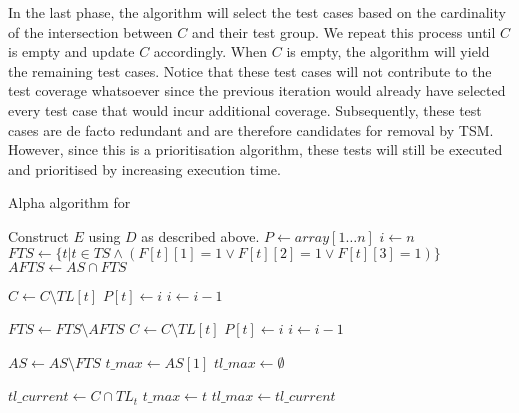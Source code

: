 \noindent In the last phase, the algorithm will select the test cases based on the cardinality of the intersection between $C$ and their test group. We repeat this process until $C$ is empty and update $C$ accordingly. When $C$ is empty, the algorithm will yield the remaining test cases. Notice that these test cases will not contribute to the test coverage whatsoever since the previous iteration would already have selected every test case that would incur additional coverage. Subsequently, these test cases are de facto redundant and are therefore candidates for removal by TSM. However, since this is a prioritisation algorithm, these tests will still be executed and prioritised by increasing execution time.

\begin{algorithm}[htbp!]
\caption{Alpha algorithm for \tcp{}}
\label{alg:alpha}
\begin{algorithmic}[1]
	
	
		\State Construct $E$ using $D$ as described above.
		\State $P \gets array[1 \dots n]$ 
		\State $i \gets n$
		\State $FTS \gets \{t \vert t \in TS \wedge (F[t][1] = 1 \vee F[t][2] = 1 \vee F[t][3] = 1)\}$
		\State $AFTS \gets AS \cap FTS$
		
		 
			\State $C \gets C \setminus TL[t]$
			\State $P[t] \gets i$
			\State $i \gets i - 1$
		\EndFor
		
		\State $FTS \gets FTS \setminus AFTS$
		 
			\State $C \gets C \setminus TL[t]$
			\State $P[t] \gets i$
			\State $i \gets i - 1$
		\EndFor
		
		\State $AS \gets AS \setminus FTS$
			\State $t\_max \gets AS[1]$ 
			\State $tl\_max \gets \emptyset$
			
				\State $tl\_current \gets C \cap TL_{t}$
					\State $t\_max \gets t$
					\State $tl\_max \gets tl\_current$
				\EndIf
			\EndFor
			

\end{algorithmic}
\end{algorithm}
